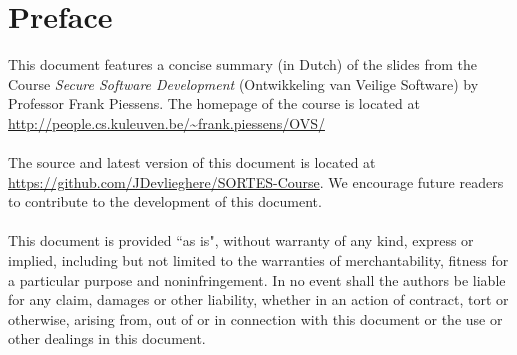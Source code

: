 \documentclass[main.tex]{subfiles}
\begin{document}
\chapter*{Preface}
This document features a concise summary (in Dutch) of the slides from the Course \textit{Secure Software Development} (Ontwikkeling van Veilige Software) by Professor Frank Piessens. The homepage of the course is located at \url{http://people.cs.kuleuven.be/~frank.piessens/OVS/}
\\\\
The source and latest version of this document is located at \url{https://github.com/JDevlieghere/SORTES-Course}. We encourage future readers to contribute to the development of this document.
\\\\
This document is provided ``as is", without warranty of any kind, express or implied, including but not limited to the warranties of merchantability, fitness for a particular purpose and noninfringement.
In no event shall the authors be liable for any claim, damages or other liability, whether in an action of contract, tort or otherwise, arising from, out of or in connection with this document or the use or other dealings in this document.
\end{document}
